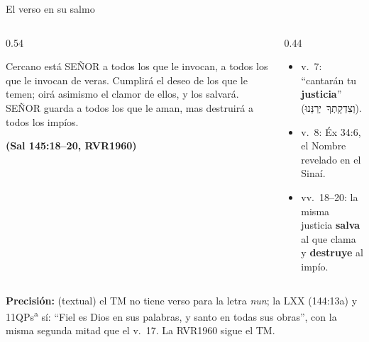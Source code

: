 \documentclass[hyperref={bookmarks=false},aspectratio=169]{beamer}
\newcommand{\heb}[1]{\mbox{\foreignlanguage{hebrew}{#1}}}
\newcommand{\SENOR}{S{\fontsize{0.78em}{1em}\selectfont EÑOR}}
\newcommand{\fuente}[1]{\par\hfill{\upshape\bfseries\footnotesize\textcolor{azul}{#1}}}
\newcommand{\destacar}[1]{\textbf{\textcolor{azul}{#1}}}
\newcommand{\precision}[1]{{\footnotesize\color{gris}\textbf{Precisión:} #1}}
\begin{document}
\begin{frame}{El verso en su salmo}
\begin{columns}[c,onlytextwidth]
\begin{column}{0.54\textwidth}
\begin{cita}Cercano está \SENOR{} a todos los que le invocan, a todos los que le invocan de veras. Cumplirá el deseo de los que le temen; oirá asimismo el clamor de ellos, y los salvará. \SENOR{} guarda a todos los que le aman, mas destruirá a todos los impíos.\fuente{(Sal 145:18--20, RVR1960)}\end{cita}
\end{column}
\begin{column}{0.44\textwidth}\small
\begin{itemize}
\item v.~7: ``cantarán tu \destacar{justicia}'' (\heb{וְצִדְקָתְךָ יְרַנֵּנוּ}).
\item v.~8: Éx 34:6, el Nombre revelado en el Sinaí.
\item vv.~18--20: la misma justicia \destacar{salva} al que clama y \destacar{destruye} al impío.
\end{itemize}
\end{column}
\end{columns}\par\medskip
\precision{(textual) el TM no tiene verso para la letra \emph{nun}; la LXX (144:13a) y 11QPs\textsuperscript{a} sí: ``Fiel es Dios en sus palabras, y santo en todas sus obras'', con la misma segunda mitad que el v.~17. La RVR1960 sigue el TM.}
\end{frame}
\end{document}

